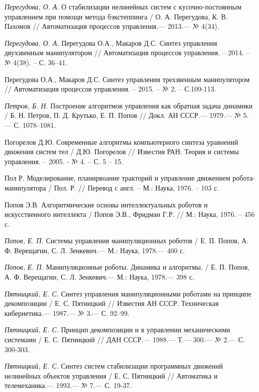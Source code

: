 \begin{thebibliography}{10}
	{\it Перегудова, О. А.} О стабилизации нелинейных систем с кусочно-постоянным управлением при помощи метода бэкстеппинга / О. А. Перегудова, К. В. Пахомов // Автоматизация процессов управления.—  2013.— № 4(34).
	
	{\it Перегудова, О. А.} Перегудова О.А., Макаров Д.С.  Синтез управления двухзвенным манипулятором // Автоматизация процессов управления. – 2014. – № 4(38). – С. 36–41.
	
	Перегудова О.А., Макаров Д.С. Синтез управления трехзвенным манипулятором // Автоматизация процессов управления. – 2015. – № 2. – С.109-113.
	
	{\it Петров, Б. Н.} Построение алгоритмов управления как обратная задача динамики / Б. Н. Петров, П. Д. Крутько, Е. П. Попов // Докл. АН СССР.— 1979.— № 5.— С. 1078–1081.
	
	Погорелов Д.Ю. Современные алгоритмы компьютерного синтеза уравнений движения систем тел / Д.Ю. Погорелов // Известия РАН. Теория и системы управления. – 2005. - № 4. – С. 5 – 15.
	
	Пол Р. Моделирование, планирвоание тракторий и управление движением робота-манипулятора / Пол. Р. // Перевод с англ. – М.: Наука, 1976. – 103 с.
	
	Попов Э.В. Алгоритмические основы интеллектуальных роботов и искусственного интеллекта / Попов Э.В., Фридман Г.Р. // М.: Наука, 1976. – 456 с.
	
	{\it Попов, Е. П.} Системы управления манипуляционных роботов / Е. П. Попов, А. Ф. Верещагин,
	С. Л. Зенкевич.— М.: Наука, 1978.— 400 с.
	
	{\it Попов, Е. П.} Манипуляционные роботы. Динамика и алгоритмы. / Е. П. Попов, А. Ф. Верещагин,
	С. Л. Зенкевич.— М.: Наука, 1978.— 398 с.
	
	{\it Пятницкий, Е. С.} Синтез управления манипуляционными роботами на принципе декомпозиции
	/ Е. С. Пятницкий // Известия АН СССР. Техническая кибернетика.—
	1987.— № 3.— С. 92–99.
	
	{\it Пятницкий, Е. С.} Принцип декомпозиции и в управлении механическими системами
	/ Е. С. Пятницкий // ДАН СССР.— 1988.— Т.— 300.— № 2.— С. 300-303.
	
	{\it Пятницкий, Е. С.} Синтез систем стабилизации программных движений нелинейных объектов управления
	/ Е. С. Пятницкий // Автоматика и телемеханика.— 1993.— № 7.— С. 19-37.
	

\end{thebibliography}
